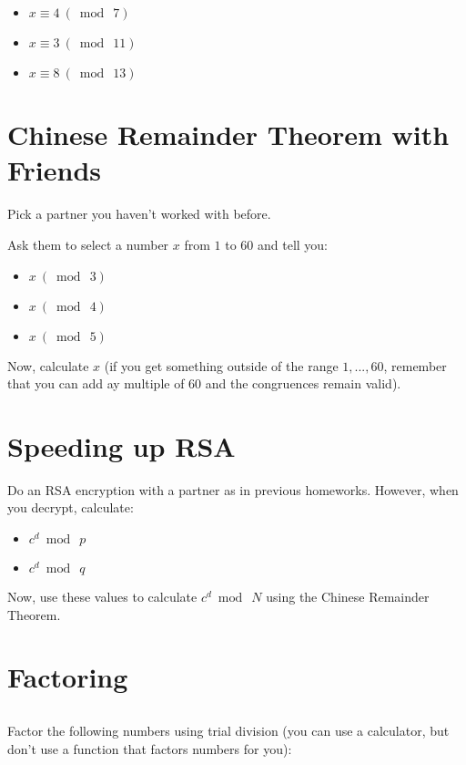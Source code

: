 \documentclass[12pt]{article}
\let\sol=\undefined
\newcommand{\sol}[1]{}
\begin{document}
\begin{itemize}
\item $x \equiv 4 ~(\bmod~7)$
\item $x \equiv 3 ~(\bmod~11)$
\item $x \equiv 8 ~(\bmod~13)$
\end{itemize}

\sol{333}

\section{Chinese Remainder Theorem with Friends}

Pick a partner you haven't worked with before.

Ask them to select a number $x$ from $1$ to $60$ and tell you:

\begin{itemize}
\item $x ~(\bmod~3)$
\item $x ~(\bmod~4)$
\item $x ~(\bmod~5)$
\end{itemize}

Now, calculate $x$ (if you get something outside of the range $1, ..., 60$, remember that you can add ay multiple of 60 and the congruences remain valid).


\section{Speeding up RSA}

Do an RSA encryption with a partner as in previous homeworks. However, when you decrypt, calculate:

\begin{itemize}
\item $c^d \bmod~p$
\item $c^d \bmod~q$
\end{itemize}

Now, use these values to calculate $c^d \bmod~N$ using the Chinese Remainder Theorem.

\section{Factoring}

\subsection{}

Factor the following numbers using trial division (you can use a calculator, but don't use a function that factors numbers for you):
\end{document}
